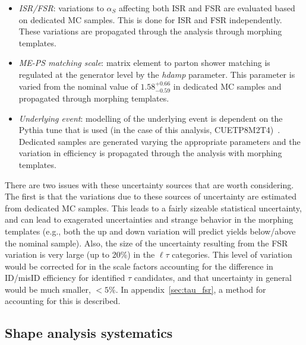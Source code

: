 \begin{itemize}
    \item \textit{ISR/FSR}: variations to $\alpha_{S}$ affecting both
        ISR and FSR are evaluated based on dedicated \ttbar MC samples.
        This is done for ISR and FSR independently.  These variations are
        propagated through the analysis through morphing templates.
    \item \textit{ME-PS matching scale}: matrix element to parton shower
        matching is regulated at the generator level by the \textit{hdamp}
        parameter.  This parameter is varied from the nominal value of
        $1.58^{+0.66}_{-0.59}$ in dedicated MC samples and propagated 
        through morphing templates.
    \item \textit{Underlying event}: modelling of the underlying event
        is dependent on the Pythia tune that is used (in the case of this
        analysis, CUETP8M2T4)~\cite{CMS-PAS-TOP-16-021}.  Dedicated samples
        are generated varying the appropriate parameters and the variation
        in efficiency is propagated through the analysis with morphing
        templates.
\end{itemize}

There are two issues with these uncertainty sources that are worth
considering.  The first is that the variations due to these sources of
uncertainty are estimated from dedicated MC samples.  This leads to a
fairly sizeable statistical uncertainty, and can lead to exagerated
uncertainties and strange behavior in the morphing templates (e.g., both
the up and down variation will predict yields below/above the nominal
sample).  Also, the size of the uncertainty resulting from the FSR
variation is very large (up to 20\%) in the $\ell\tau$ categories.  This
level of variation would be corrected for in the scale factors
accounting for the difference in ID/misID efficiency for identified
$\tau$ candidates, and that uncertainty in general would be much
smaller, $<5\%$.  In appendix~\ref{sec:tau_fsr}, a method for accounting
for this is described.




\subsection{Shape analysis systematics}

